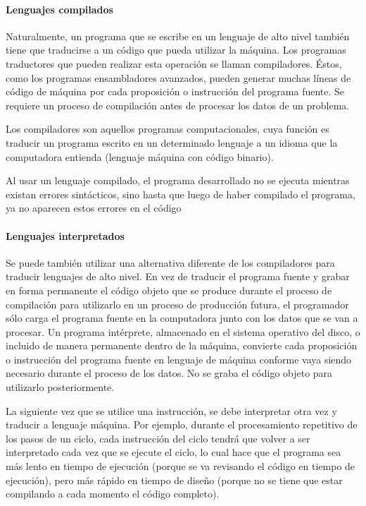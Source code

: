 \documentclass[12pt,legalpaper]{report}
\begin{document}
				\paragraph{Lenguajes compilados}

Naturalmente, un programa que se escribe en un lenguaje de alto nivel también tiene que traducirse a un código que pueda utilizar la máquina. Los programas traductores que pueden realizar esta operación se llaman compiladores. Éstos, como los programas ensambladores avanzados, pueden generar muchas líneas de código de máquina por cada proposición o instrucción del programa fuente. Se requiere un proceso de compilación antes de procesar los datos de un problema.

Los compiladores son aquellos programas computacionales, cuya función es traducir un programa escrito en un determinado lenguaje a un idioma que la computadora entienda (lenguaje máquina con código binario).

Al usar un lenguaje compilado, el programa desarrollado no se ejecuta mientras existan errores sintácticos, sino hasta que luego de haber compilado el programa, ya no aparecen estos errores en el código

				\paragraph{Lenguajes interpretados}

Se puede también utilizar una alternativa diferente de los compiladores para traducir lenguajes de alto nivel. En vez de traducir el programa fuente y grabar en forma permanente el código objeto que se produce durante el proceso de compilación para utilizarlo en un proceso de producción futura, el programador sólo carga el programa fuente en la computadora junto con los datos que se van a procesar. Un programa intérprete, almacenado en el sistema operativo del disco, o incluido de manera permanente dentro de la máquina, convierte cada proposición o instrucción del programa fuente en lenguaje de máquina conforme vaya siendo necesario durante el proceso de los datos. No se graba el código objeto para utilizarlo posteriormente.

La siguiente vez que se utilice una instrucción, se debe interpretar otra vez y traducir a lenguaje máquina. Por ejemplo, durante el procesamiento repetitivo de los pasos de un ciclo, cada instrucción del ciclo tendrá que volver a ser interpretado cada vez que se ejecute el ciclo, lo cual hace que el programa sea más lento en tiempo de ejecución (porque se va revisando el código en tiempo de ejecución), pero más rápido en tiempo de diseño (porque no se tiene que estar compilando a cada momento el código completo). 
\end{document}
